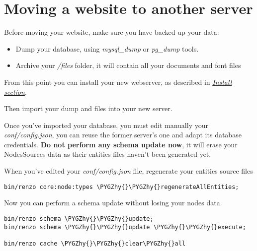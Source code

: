 \documentclass[letterpaper,10pt,english]{sphinxmanual}
\def\PYGZhy{\char`\-}
\begin{document}
\chapter{Moving a website to another server}
\label{moving:moving}\label{moving::doc}\label{moving:moving-a-website-to-another-server}
Before moving your website, make sure you have backed up your data:
\begin{itemize}
\item {} 
Dump your database, using \emph{mysql\_dump} or \emph{pg\_dump} tools.

\item {} 
Archive your \emph{/files} folder, it will contain all your documents and font files

\end{itemize}

From this point you can install your new webserver, as described in {\hyperref[getting_started:getting-started]{\emph{Install section}}}.

Then import your dump and files into your new server.

Once you’ve imported your database, you must edit manually your \emph{conf/config.json}, you can reuse the former server’s one and adapt its database credentials. \textbf{Do not perform any schema update now}, it will erase your NodesSources data as their entities files haven’t been generated yet.

When you’ve edited your \emph{conf/config.json} file, regenerate your entities source files

\begin{Verbatim}[commandchars=\\\{\}]
bin/renzo core:node:types \PYGZhy{}\PYGZhy{}regenerateAllEntities;
\end{Verbatim}

Now you can perform a schema update without losing your nodes data

\begin{Verbatim}[commandchars=\\\{\}]
bin/renzo schema \PYGZhy{}\PYGZhy{}update;
bin/renzo schema \PYGZhy{}\PYGZhy{}update \PYGZhy{}\PYGZhy{}execute;

bin/renzo cache \PYGZhy{}\PYGZhy{}clear\PYGZhy{}all
\end{Verbatim}
\end{document}

